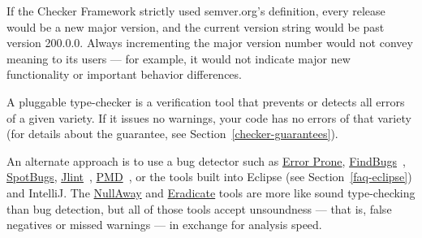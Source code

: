If the Checker Framework strictly used semver.org's definition, every
release would be a new major version, and the current version string would
be
past version 200.0.0.
Always incrementing the major version number would not convey meaning to
its users --- for example, it would not indicate major new functionality or
important behavior differences.






A pluggable type-checker
is a verification tool that prevents or detects all errors of a given
variety.  If it issues no warnings, your code has no errors of that
variety (for details about the guarantee, see
Section~\ref{checker-guarantees}).

An alternate approach is to use a bug detector such as
\href{https://errorprone.info/}{Error Prone},
\href{https://findbugs.sourceforge.net/}{FindBugs}~\cite{HovemeyerP2004,HovemeyerSP2005},
\href{https://github.com/spotbugs/spotbugs}{SpotBugs},
\href{https://jlint.sourceforge.net/}{Jlint}~\cite{Artho2001},
\href{https://pmd.github.io/}{PMD}~\cite{Copeland2005},
or the
tools built into Eclipse (see Section~\ref{faq-eclipse}) and IntelliJ\@.
The \href{https://github.com/uber/NullAway}{NullAway} and
\href{https://fbinfer.com/docs/1.1.0/checker-eradicate/}{Eradicate} tools are more
like sound type-checking than bug detection, but all of those tools accept
unsoundness --- that is, false negatives or missed warnings --- in exchange
for analysis speed.

